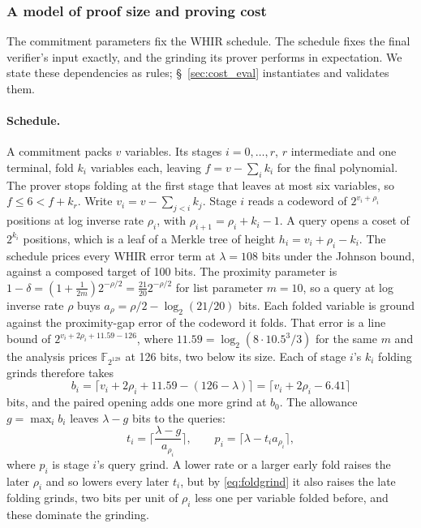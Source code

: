 \documentclass[11pt]{article}
\newcommand{\F}{\mathbb{F}_{2^{128}}}
\begin{document}
\subsubsection{A model of proof size and proving cost}\label{sec:cost_model}

The commitment parameters fix the WHIR schedule. The schedule fixes the
final verifier's input exactly, and the grinding its prover performs in
expectation. We state these dependencies as rules; \S~\ref{sec:cost_eval}
instantiates and validates them.

\paragraph{Schedule.} A commitment packs $v$ variables. Its
stages $i=0,\dots,r$, $r$ intermediate and one terminal, fold $k_i$ variables
each, leaving $f=v-\sum_ik_i$ for the final polynomial. The prover stops
folding at the first stage that leaves at most six variables, so $f\le6<f+k_r$. Write
$v_i=v-\sum_{j<i}k_j$. Stage $i$ reads a codeword of $2^{v_i+\rho_i}$
positions at log inverse rate $\rho_i$, with $\rho_{i+1}=\rho_i+k_i-1$. A query opens a coset of
$2^{k_i}$ positions, which is a leaf of a Merkle tree of height
$h_i=v_i+\rho_i-k_i$. The schedule prices every WHIR error term at
$\lambda=108$ bits under the Johnson bound, against a composed target of
100 bits. The proximity parameter is $1-\delta=(1+\tfrac{1}{2m})2^{-\rho/2}=\tfrac{21}{20}2^{-\rho/2}$ for list parameter $m=10$, so a query at log inverse rate $\rho$ buys $a_\rho=\rho/2-\log_2(21/20)$ bits. Each folded
variable is ground against the proximity-gap error of the codeword it folds.
That error is a line bound of $2^{v_i+2\rho_i+11.59-126}$, where
$11.59=\log_2(8\cdot10.5^3/3)$ for the same $m$ and the analysis
prices $\F$ at 126 bits, two below its size. Each of stage $i$'s $k_i$
folding grinds therefore takes
\begin{equation}\label{eq:foldgrind}
b_i=\lceil v_i+2\rho_i+11.59-(126-\lambda)\rceil=\lceil v_i+2\rho_i-6.41\rceil
\end{equation}
bits, and the paired opening adds one more grind at $b_0$. The allowance
$g=\max_ib_i$ leaves $\lambda-g$ bits to the queries:
\begin{equation}\label{eq:queries}
t_i=\Big\lceil\frac{\lambda-g}{a_{\rho_i}}\Big\rceil,\qquad
p_i=\lceil\lambda-t_ia_{\rho_i}\rceil,
\end{equation}
where $p_i$ is stage $i$'s query grind. A lower rate or a larger early fold
raises the later $\rho_i$ and so lowers every later $t_i$, but by
\eqref{eq:foldgrind} it also raises the late folding grinds, two bits per
unit of $\rho_i$ less one per variable folded before, and these dominate the
grinding.
\end{document}
